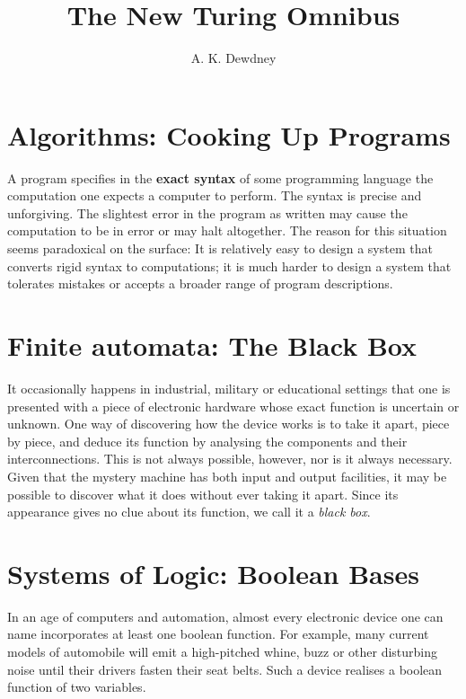 \documentclass[a4paper]{article}
\begin{document}
\title{The New Turing Omnibus}
\author{A. K. Dewdney}
\maketitle %
\tableofcontents
\newpage

\section{Algorithms: Cooking Up Programs}
A program specifies in the \textbf{exact syntax} of some programming language the computation one expects a computer to perform. The syntax is precise and unforgiving. The slightest error in the program as written may cause the computation to be in error or may halt altogether. The reason for this situation seems paradoxical on the surface: It is relatively easy to design a system that converts rigid syntax to computations; it is much harder to design a system that tolerates mistakes or accepts a broader range of program descriptions.

\section{Finite automata: The Black Box}
It occasionally happens in industrial, military or educational settings that one is presented with a piece of electronic hardware whose exact function is uncertain or unknown. One way of discovering how the device works is to take it apart, piece by piece, and deduce its function by analysing the components and their interconnections. This is not always possible, however, nor is it always necessary. Given that the mystery machine has both input and output facilities, it may be possible to discover what it does without ever taking it apart. Since its appearance gives no clue about its function, we call it a \textit{black box}.

\section{Systems of Logic: Boolean Bases}
In an age of computers and automation, almost every electronic device one can name incorporates at least one boolean function. For example, many current models of automobile will emit a high-pitched whine, buzz or other disturbing noise until their drivers fasten their seat belts. Such a device realises a boolean function of two variables.
\end{document}
